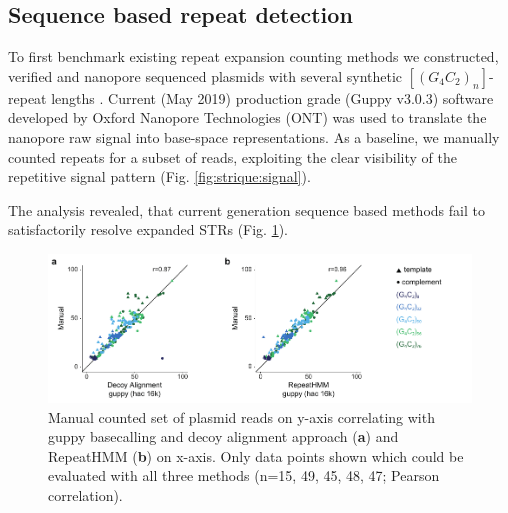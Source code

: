 \subsection{Sequence based repeat detection}
\label{subsec:strique:seq_repeat_counts}

To first benchmark existing repeat expansion counting methods we constructed, verified and nanopore sequenced plasmids with several synthetic $ [(G_{4}C_{2})_{n}] $-repeat lengths \cite{Mizielinska2014}. Current (May 2019) production grade (Guppy v3.0.3) software developed by Oxford Nanopore Technologies (ONT) was used to translate the nanopore raw signal into base-space representations. As a baseline, we manually counted repeats for a subset of reads, exploiting the clear visibility of the repetitive signal pattern (Fig. \ref{fig:strique:signal}).



The analysis revealed, that current generation sequence based methods fail to satisfactorily resolve expanded STRs (Fig. \ref{fig:strique:count_seq_manual}).


\begin{figure}[h]
    \centering
    \includegraphics[width=1.0\textwidth]{figures/strique/count_seq_manual.pdf}
    \captionsetup{format=plain}
    \caption[Correlation and strand bias in STR analysis methods]{Manual counted set of plasmid reads on y-axis correlating with guppy basecalling and decoy alignment approach (\textbf{a}) and RepeatHMM (\textbf{b}) on x-axis. Only data points shown which could be evaluated with all three methods (n=15, 49, 45, 48, 47; Pearson correlation).}
    \label{fig:strique:count_seq_manual}
\end{figure}

